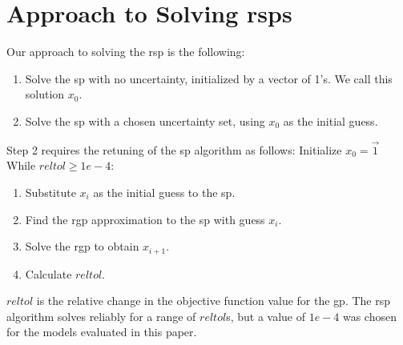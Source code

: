 \section{Approach to Solving \gls{rsp}s}

Our approach to solving the \gls{rsp} is the following:

\begin{enumerate}
    \item Solve the \gls{sp} with no uncertainty, initialized by a vector of 1's. We call this solution $x_0$.
    \item Solve the \gls{sp} with a chosen uncertainty set, using $x_0$ as the initial guess.
\end{enumerate}

Step 2 requires the retuning of the \gls{sp} algorithm as follows:
\newline
\newline
Initialize $x_0 = \vec{1}$ \newline
 While $reltol \geq 1e-4$:
    \begin{enumerate}
        \item Substitute $x_i$ as the initial guess to the \gls{sp}.
        \item Find the \gls{rgp} approximation to the \gls{sp} with guess $x_i$.
        \item Solve the \gls{rgp} to obtain $x_{i+1}$.
        \item Calculate $reltol$.
    \end{enumerate}

$reltol$ is the relative change in the objective function value for the \gls{gp}.
The \gls{rsp} algorithm solves reliably for a range of $reltol$s,
but a value of $1e-4$ was chosen for the models evaluated in this paper.
